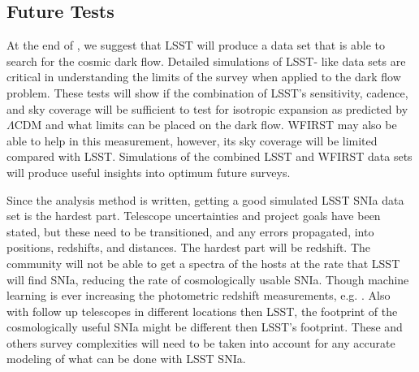 \documentclass[apj, iop]{emulateapj}
\newcommand{\sn}{SNIa}
\newcommand{\todo}[1]{\textbf{\textcolor{red}{#1}}}
\newcommand{\lcdm}{$\Lambda$CDM}     %
\begin{document}
\subsection{Future Tests}\label{future-tests}

At the end of \cite{Mathews16}, we suggest that LSST will produce a data set
that is able to search for the cosmic dark flow. Detailed simulations of LSST-
like data sets are critical in understanding the limits of the survey when
applied to the dark flow problem. These tests will show if the combination of
LSST's sensitivity, cadence, and sky coverage will be sufficient to test for
isotropic expansion as predicted by \lcdm{} and what limits can be placed on the
dark flow. WFIRST may also be able to help in this measurement, however, its sky
coverage will be limited compared with LSST. Simulations of the combined LSST
and WFIRST data sets will produce useful insights into optimum future surveys.

Since the analysis method is written, getting a good simulated LSST \sn{} data
set is the hardest part. Telescope uncertainties and project goals have been
stated, but these need to be transitioned, and any errors propagated, into
positions, redshifts, and distances. The hardest part will be redshift. The
community will not be able to get a spectra of the hosts at the rate that LSST
will find \sn, reducing the rate of cosmologically usable \sn. Though machine
learning is ever increasing the photometric redshift measurements, e.g.
\cite{Kind13}. Also with follow up telescopes in different locations then LSST,
the footprint of the cosmologically useful \sn{} might be different then LSST's
footprint. These and others survey complexities will need to be taken into
account for any accurate modeling of what can be done with LSST \sn{}.
\end{document}

